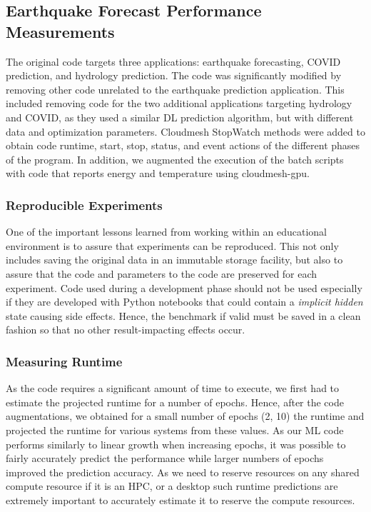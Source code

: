 \documentclass[utf8]{FrontiersinVancouver} %
\newcommand{\TODO}[2]{\todo[inline]{{\bf \color{red} #1} #2}}
\begin{document}

\subsection{Earthquake Forecast Performance Measurements}
\label{sec:perf-main}

The original code targets three applications: earthquake forecasting,
COVID prediction, and hydrology prediction.  The code was
significantly modified by removing other code unrelated to the
earthquake prediction application. This included removing code for the
two additional applications targeting hydrology and COVID, as they
used a similar DL prediction algorithm, but with different data and
optimization parameters. Cloudmesh StopWatch methods were added to
obtain code runtime, start, stop, status, and event actions of the
different phases of the program. In addition, we augmented the
execution of the batch scripts with code that reports energy and
temperature using cloudmesh-gpu.


\subsubsection{Reproducible Experiments}

One of the important lessons learned from working within an
educational environment is to assure that experiments can be
reproduced. This not only includes saving the original data in an
immutable storage facility, but also to assure that the code and
parameters to the code are preserved for each experiment. Code used
during a development phase should not be used especially if they are
developed with Python notebooks that could contain a {\em implicit
  hidden} state causing side effects. Hence, the benchmark if valid
must be saved in a clean fashion so that no other result-impacting
effects occur.

\subsubsection{Measuring Runtime}
\label{sec:perf-runtime}

As the code requires a significant amount of time to execute, we first
had to estimate the projected runtime for a number of epochs. Hence,
after the code augmentations, we obtained for a small number of epochs
(2, 10) the runtime and projected the runtime for various systems from
these values.  As our ML code performs similarly to linear growth when
increasing epochs, it was possible to fairly accurately predict the
performance while larger numbers of epochs improved the prediction
accuracy. As we need to reserve resources on any shared compute
resource if it is an HPC, or a desktop such runtime predictions are
extremely important to accurately estimate it to reserve the compute
resources.
\end{document}

